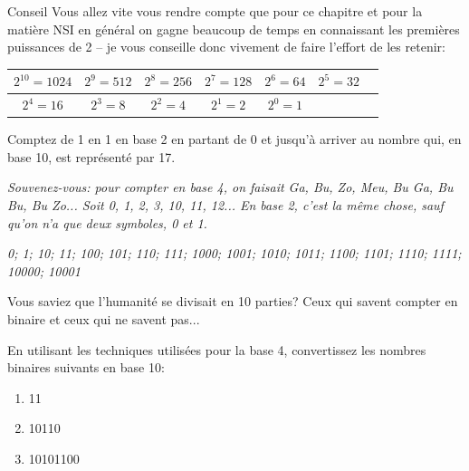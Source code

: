 \documentclass[12pt]{article}
\newenvironment{MaReponse}
		{\begin{greyedtextbox}\itshape} %
		{\end{greyedtextbox}}            %
\newenvironment{alphenum}
{\begin{enumerate}[label=\alph*.]}
	{\end{enumerate}}
\begin{document}
	\begin{MonAmp}{Conseil}
		Vous allez vite vous rendre compte que pour ce chapitre et pour la matière NSI en général on gagne beaucoup de temps en connaissant les premières puissances de 2 -- je vous conseille donc vivement de faire l'effort de les retenir:
	\end{MonAmp}
	
	  \begin{tabular}{|c|c|c|c|c|c|c|}
		\hline
		$2^{10} = 1024$ & $2^9 = 512$ & $2^8 = 256$ & $2^7 = 128$ & $2^6 = 64$ & $2^5 = 32$ \\
		\hline
		$2^4 = 16$ & $2^3 = 8$ & $2^2 = 4$ & $2^1 = 2$ & $2^0 = 1$ &\\
		\hline
	\end{tabular}

	\begin{MonExo}
		Comptez de 1 en 1 en base 2 en partant de 0 et jusqu’à arriver au nombre qui, en base 10, est représenté par 17.
		
		\textit{Souvenez-vous: pour compter en base 4, on faisait Ga, Bu, Zo, Meu, Bu Ga, Bu Bu, Bu Zo... Soit 0, 1, 2, 3, 10, 11, 12... En base 2, c'est la même chose, sauf qu'on n'a que deux symboles, 0 et 1.}
	\end{MonExo}
	\begin{MaReponse}
		0; 1; 10; 11; 100; 101; 110; 111; 1000; 1001; 1010; 1011; 1100; 1101; 1110; 1111; 10000; 10001
		
		Vous saviez que l'humanité se divisait en 10 parties? Ceux qui savent compter en binaire et ceux qui ne savent pas...
	\end{MaReponse}
	
	\begin{MonExo}
		En utilisant les techniques utilisées pour la base 4, convertissez les nombres binaires suivants en base 10:
		\begin{alphenum}
			\item 11
			\item 10110
			\item 10101100
		\end{alphenum}
	\end{MonExo}
\end{document}
